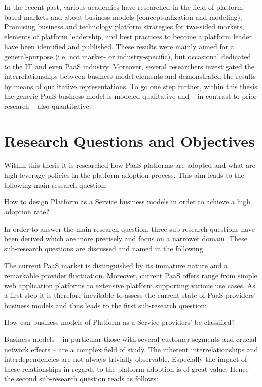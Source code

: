 In the recent past, various academics have researched in the field of platform-based markets and about business models (conceptualization and modeling). Promising business and technology platform strategies for two-sided markets, elements of platform leadership, and best practices to become a platform leader have been identified and published. These results were mainly aimed for a general-purpose (i.e. not market- or industry-specific), but occasional dedicated to the \ac{IT} and even \ac{PaaS} industry. Moreover, several researchers investigated the interrelationships between business model elements and demonstrated the results by means of qualitative representations. To go one step further, within this thesis the generic \ac{PaaS} business model is modeled qualitative and -- in contrast to prior research -- also quantitative.

\section{Research Questions and Objectives}\label{ch:intro:rq}

Within this thesis it is researched how \ac{PaaS} platforms are adopted and what are high leverage policies in the platform adoption process. This aim leads to the following main research question:

\begin{MRQ}\label{mrq}
How to design Platform as a Service business models in order to achieve a high adoption rate?
\end{MRQ}

In order to answer the main research question, three sub-research questions have been derived which are more precisely and focus on a narrower domain. These sub-research questions are discussed and named in the following.

The current \ac{PaaS} market is distinguished by its immature nature and a remarkable provider fluctuation. Moreover, current \ac{PaaS} offers range from simple web application platforms to extensive platform supporting various use cases. As a first step it is therefore inevitable to assess the current state of \ac{PaaS} providers' business models and thus leads to the first sub-research question:

\begin{SRQ}\label{srq1}
How can business models of Platform as a Service providers' be classified?
\end{SRQ}

Business models -- in particular those with several customer segments and crucial network effects -- are a complex field of study. The inherent interrelationships and interdependencies are not always trivially observable. Especially the impact of these relationships in regards to the platform adoption is of great value. Hence the second sub-research question reads as follows:

